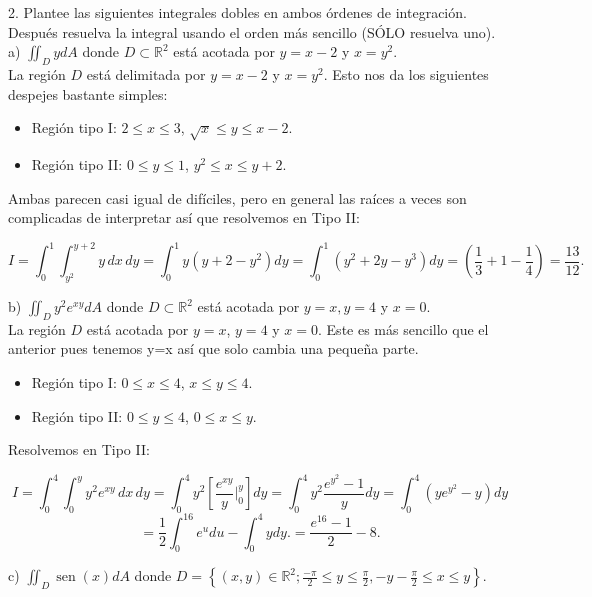 2. Plantee las siguientes integrales dobles en ambos órdenes de integración. Después resuelva la integral usando el orden más sencillo (SÓLO resuelva uno).\\
a) \( \iint_{D} y d A \) donde \( D \subset \mathbb{R}^{2} \) está acotada por \( y=x-2 \) y \( x=y^{2} \). \\
La región \( D \) está delimitada por \( y = x - 2 \) y \( x = y^2 \). Esto nos da los siguientes despejes bastante simples:
\begin{itemize}
    \item Región tipo I: \( 2 \leq x \leq 3 \), \( \sqrt{x} \leq y \leq x - 2 \).  
    \item Región tipo II: \( 0 \leq y \leq 1 \), \( y^2 \leq x \leq y + 2 \).  
\end{itemize}

Ambas parecen casi igual de difíciles, pero en general las raíces a veces son complicadas de interpretar así que resolvemos en Tipo II:  

\[
I = \int_0^1 \int_{y^2}^{y+2} y \, dx \, dy = \int_0^1 y (y + 2 - y^2) dy = \int_0^1 (y^2 + 2y - y^3) dy = \left( \frac{1}{3} + 1 - \frac{1}{4} \right) = \frac{13}{12}.
\]

b) \( \iint_{D} y^{2} e^{x y} d A \) donde \( D \subset \mathbb{R}^{2} \) está acotada por \( y=x, y=4 \) y \( x=0 \). \\
La región \( D \) está acotada por \( y = x \), \( y = 4 \) y \( x = 0 \). Este es más sencillo que el anterior pues tenemos y=x así que solo cambia una pequeña parte.
\begin{itemize}
    \item Región tipo I: \( 0 \leq x \leq 4 \), \( x \leq y \leq 4 \).  
    \item Región tipo II: \( 0 \leq y \leq 4 \), \( 0 \leq x \leq y \).  
\end{itemize}

Resolvemos en Tipo II:  

\[
I = \int_0^4 \int_0^y y^2 e^{xy} \, dx \, dy = \int_0^4 y^2 \left[ \frac{e^{xy}}{y} \Big|_0^y \right] dy = \int_0^4 y^2 \frac{e^{y^2} - 1}{y} dy = \int_0^4 (y e^{y^2} - y) dy
\]
\[
= \frac{1}{2} \int_0^{16} e^u du - \int_0^4 y dy. = \frac{e^{16} - 1}{2} - 8.
\]  

c) \( \iint_{D} \operatorname{sen}(x) d A \) donde \( D=\left\{(x, y) \in \mathbb{R}^{2} ; \frac{-\pi}{2} \leq y \leq \frac{\pi}{2},-y-\frac{\pi}{2} \leq x \leq y\right\} \). \\

